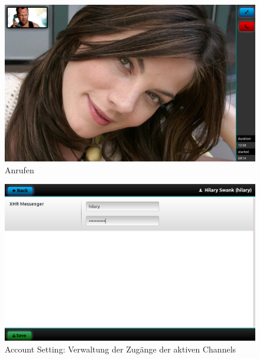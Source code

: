 	\begin{figure}[H]
		\centering
		\includegraphics[height=0.4\textheight]{../ui/img/finalUi/phoneView.png}
		\caption{Anrufen}
		\label{phone screen}
	\end{figure}
	\begin{figure}[H]
		\centering
		\includegraphics[height=0.4\textheight]{../ui/img/finalUi/accountEditView.png}
		\caption{Account Setting: Verwaltung der Zugänge der aktiven Channels}
		\label{account edit screen}
	\end{figure}